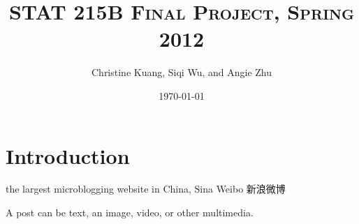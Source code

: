 \documentclass[11pt]{article}
\title{\scshape STAT 215B Final Project, Spring 2012}
\author{Christine Kuang, Siqi Wu, and Angie Zhu}
\date{\today} %
\newcommand{\1}[1]{{\mathbf 1}\left\{#1\right\}}        %
\begin{document}
\setlength\footskip{0.5in}


\lstset{
showspaces=false, 
language=R, 
basicstyle=\ttfamily, 
tabsize=3, 
showstringspaces=false, 
columns=flexible%
}

\maketitle








\section{Introduction}

the largest microblogging website in China, Sina Weibo 新浪微博

A post can be text, an image, video, or other multimedia.
\end{document}
